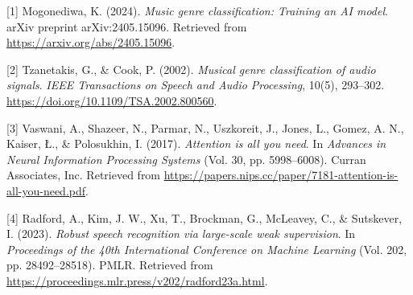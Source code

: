 \documentclass{article}
\begin{document}
    {\small

      [1] Mogonediwa, K. (2024). \textit{Music genre classification: Training an AI model}. arXiv preprint arXiv:2405.15096. Retrieved from \url{https://arxiv.org/abs/2405.15096}.

      [2] Tzanetakis, G., \& Cook, P. (2002). \textit{Musical genre classification of audio signals}. \textit{IEEE Transactions on Speech and Audio Processing}, 10(5), 293--302. \url{https://doi.org/10.1109/TSA.2002.800560}.

      [3] Vaswani, A., Shazeer, N., Parmar, N., Uszkoreit, J., Jones, L., Gomez, A. N., Kaiser, {\L}., \& Polosukhin, I. (2017). \textit{Attention is all you need}. In \textit{Advances in Neural Information Processing Systems} (Vol. 30, pp. 5998--6008). Curran Associates, Inc. Retrieved from \url{https://papers.nips.cc/paper/7181-attention-is-all-you-need.pdf}.

      [4] Radford, A., Kim, J. W., Xu, T., Brockman, G., McLeavey, C., \& Sutskever, I. (2023). \textit{Robust speech recognition via large-scale weak supervision}. In \textit{Proceedings of the 40th International Conference on Machine Learning} (Vol. 202, pp. 28492--28518). PMLR. Retrieved from \url{https://proceedings.mlr.press/v202/radford23a.html}.

    }
\end{document}
